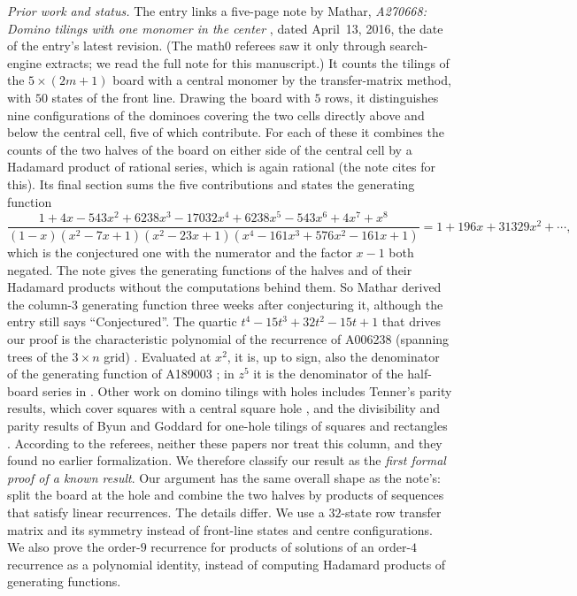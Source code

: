 \documentclass[11pt]{amsart}
\theoremstyle{plain}
\theoremstyle{definition}
\begin{document}
\emph{Prior work and status.} The entry links a five-page note by Mathar, \emph{A270668: Domino tilings with one monomer in the center} \cite{MatharNote}, dated April~13, 2016, the date of the entry's latest revision. (The math0 referees saw it only through search-engine extracts; we read the full note for this manuscript.) It counts the tilings of the $5\times(2m+1)$ board with a central monomer by the transfer-matrix method, with $50$ states of the front line. Drawing the board with $5$ rows, it distinguishes nine configurations of the dominoes covering the two cells directly above and below the central cell, five of which contribute. For each of these it combines the counts of the two halves of the board on either side of the central cell by a Hadamard product of rational series, which is again rational (the note cites \cite{EC1} for this). Its final section sums the five contributions and states the generating function
\[
  \frac{1+4x-543x^2+6238x^3-17032x^4+6238x^5-543x^6+4x^7+x^8}{(1-x)(x^2-7x+1)(x^2-23x+1)(x^4-161x^3+576x^2-161x+1)}
  =1+196x+31329x^2+\cdots,
\]
which is the conjectured one with the numerator and the factor $x-1$ both negated. The note gives the generating functions of the halves and of their Hadamard products without the computations behind them. So Mathar derived the column-$3$ generating function three weeks after conjecturing it, although the entry still says ``Conjectured''. The quartic $t^4-15t^3+32t^2-15t+1$ that drives our proof is the characteristic polynomial of the recurrence of A006238 (spanning trees of the $3\times n$ grid) \cite{A006238}. Evaluated at $x^2$, it is, up to sign, also the denominator of the generating function of A189003 \cite{A189003}; in $z^5$ it is the denominator of the half-board series in \cite{MatharNote}. Other work on domino tilings with holes includes Tenner's parity results, which cover squares with a central square hole \cite{Tenner}, and the divisibility and parity results of Byun and Goddard for one-hole tilings of squares and rectangles \cite{BG}. According to the referees, neither these papers nor \cite{Ciucu} treat this column, and they found no earlier formalization. We therefore classify our result as the \emph{first formal proof of a known result}. Our argument has the same overall shape as the note's: split the board at the hole and combine the two halves by products of sequences that satisfy linear recurrences. The details differ. We use a $32$-state row transfer matrix and its symmetry instead of front-line states and centre configurations. We also prove the order-$9$ recurrence for products of solutions of an order-$4$ recurrence as a polynomial identity, instead of computing Hadamard products of generating functions.
\end{document}
